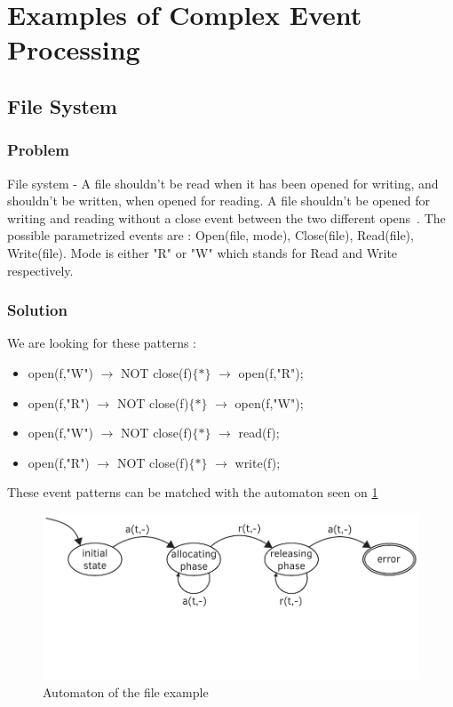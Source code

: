 			
	\section{Examples of Complex Event Processing}
 
 
		\subsection{File System}
			\subsubsection{Problem}
				File system - A file shouldn't be read when it has been opened for writing, and shouldn't be written, when opened for reading. 
				A file shouldn't be opened for writing and reading without a close event between the two different opens~\citep{marq}.
				The possible parametrized events are : 
				Open(file, mode), 
				Close(file), 
				Read(file), 
				Write(file). 
				Mode is either "R" or "W" which stands for Read and Write respectively.
			\subsubsection{Solution}
				We are looking for these patterns :

				\begin{itemize}
					\item open(f,"W") $\rightarrow$ NOT close(f)$\{\ast\}$ $\rightarrow$ open(f,"R");
					\item open(f,"R") $\rightarrow$ NOT close(f)$\{\ast\}$ $\rightarrow$ open(f,"W");
					\item open(f,"W") $\rightarrow$ NOT close(f)$\{\ast\}$ $\rightarrow$ read(f);
					\item open(f,"R") $\rightarrow$ NOT close(f)$\{\ast\}$ $\rightarrow$ write(f);
				\end{itemize}

				These event patterns can be matched with the automaton seen on \cref{fig:cep:ptea}
				
				\begin{figure}[h]
				\centering
				\includegraphics[width=0.7\linewidth]{include/figures/chapter_5/illustration_3}
				\caption{Automaton of the file example}
				\label{fig:cep:ptea}
				\end{figure}

